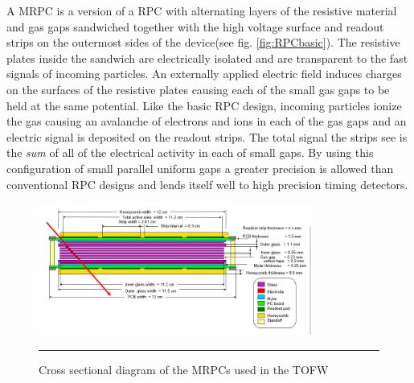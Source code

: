 A MRPC is a version of a RPC with alternating layers of the resistive material and gas gaps sandwiched together with the high voltage surface and readout strips on the outermost sides of the device\citep{Akindinov:2000rq}(see fig. \ref{fig:RPCbasic}). The resistive plates inside the sandwich are electrically isolated and are transparent to the fast signals of incoming particles. An externally applied electric field induces charges on the surfaces of the resistive plates causing each of the small gas gaps to be held at the same potential. Like the basic RPC design, incoming particles ionize the gas causing an avalanche of electrons and ions in each of the gas gaps and an electric signal is deposited on the readout strips. The total signal the strips see is the \textit{sum} of all of the electrical activity in each of small gaps. By using this configuration of small parallel uniform gaps a greater precision is allowed than conventional RPC designs and lends itself well to high precision timing detectors.

\begin{figure}[ht!]
  \centering
    \includegraphics[width=0.8\textwidth]{Figures/MRPC_TOFW.jpg}
    \rule{35em}{0.5pt}
  \caption[Cross sectional diagram of the MRPCs used in the TOFW]{Cross sectional diagram of the MRPCs used in the TOFW}
  \label{fig:MRPCTOFW}
\end{figure}

